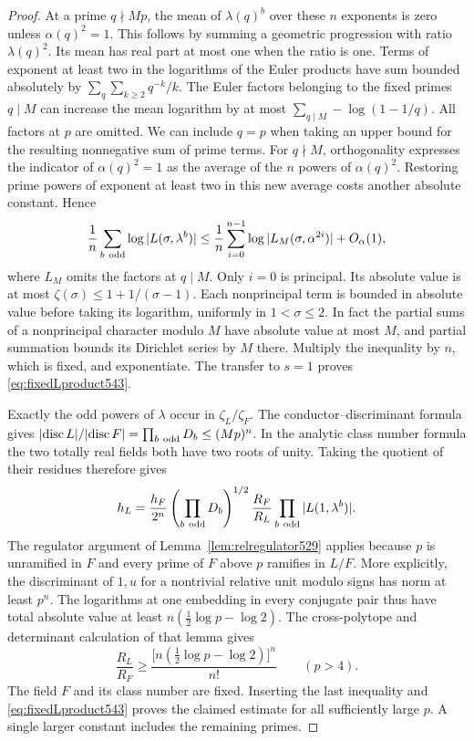 \documentclass[a4paper,11pt]{article}
\theoremstyle{definition}
\theoremstyle{remark}
\numberwithin{equation}{section}
\begin{document}
\begin{proof}
At a prime \(q\nmid Mp\), the mean of \(\lambda(q)^b\) over
these \(n\) exponents is zero unless \(\alpha(q)^2=1\).
This follows by summing a geometric progression with ratio
\(\lambda(q)^2\). Its mean has real part at most one when
the ratio is one. Terms of exponent at least two in the
logarithms of the Euler products have sum bounded absolutely
by \(\sum_q\sum_{k\ge2}q^{-k}/k\). The Euler factors belonging
to the fixed primes \(q\mid M\) can increase the mean logarithm
by at most \(\sum_{q\mid M}-\log(1-1/q)\). All factors at
\(p\) are omitted. We can include \(q=p\) when taking an
upper bound for the resulting nonnegative sum of prime terms.
For \(q\nmid M\), orthogonality expresses the indicator of
\(\alpha(q)^2=1\) as the average of the \(n\) powers of
\(\alpha(q)^2\). Restoring prime powers of exponent at least
two in this new average costs another absolute constant. Hence
\[
  \frac1n\sum_{b\ {\rm odd}}\log |L(\sigma,\lambda^b)|
   \le \frac1n\sum_{i=0}^{n-1}
            \log |L_M(\sigma,\alpha^{2i})|+O_\alpha(1),
\]
where \(L_M\) omits the factors at \(q\mid M\).
Only \(i=0\) is principal. Its absolute value is at most
\(\zeta(\sigma)\le1+1/(\sigma-1)\).
Each nonprincipal term is bounded in absolute value before
taking its logarithm, uniformly in \(1<\sigma\le2\).
In fact the partial sums of a nonprincipal character modulo
\(M\) have absolute value at most \(M\), and partial summation
bounds its Dirichlet series by \(M\) there.
Multiply the inequality by \(n\), which is fixed, and
exponentiate. The transfer to \(s=1\) proves
\eqref{eq:fixedLproduct543}.

Exactly the odd powers of \(\lambda\) occur in
\(\zeta_L/\zeta_F\). The conductor--discriminant formula gives
\(\lvert\operatorname{disc}L\rvert/
\lvert\operatorname{disc}F\rvert=\prod_{b\ {\rm odd}}D_b
\le(Mp)^n\).
In the analytic class number formula the two totally real
fields both have two roots of unity. Taking the quotient of
their residues therefore gives
\[
   h_L=\frac{h_F}{2^n}
        \left(\prod_{b\ {\rm odd}}D_b\right)^{1/2}
        \frac{R_F}{R_L}
        \prod_{b\ {\rm odd}}|L(1,\lambda^b)| .
\]
The regulator argument of Lemma~\ref{lem:relregulator529}
applies because \(p\) is unramified in \(F\) and every prime
of \(F\) above \(p\) ramifies in \(L/F\). More explicitly,
the discriminant of \(1,u\) for a nontrivial relative unit
modulo signs has norm at least \(p^n\). The logarithms at one
embedding in every conjugate pair thus have total absolute
value at least \(n(\frac12\log p-\log2)\). The cross-polytope
and determinant calculation of that lemma gives
\[
     \frac{R_L}{R_F}\ge
     \frac{\bigl[n(\tfrac12\log p-\log2)\bigr]^n}{n!}
     \qquad (p>4).
\]
The field \(F\) and its class number are fixed. Inserting the
last inequality and \eqref{eq:fixedLproduct543} proves the
claimed estimate for all sufficiently large \(p\). A single
larger constant includes the remaining primes.


\end{proof}
\end{document}
